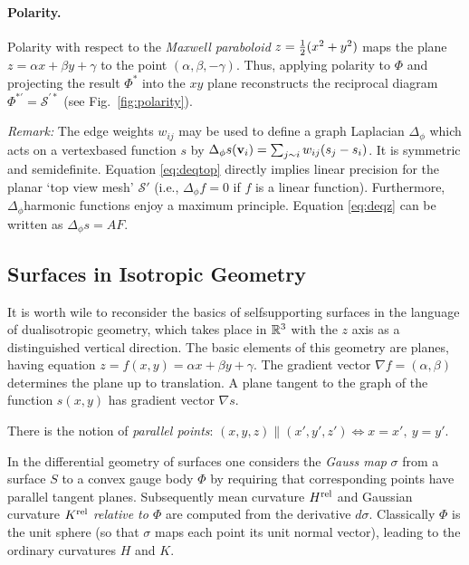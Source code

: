 \documentclass[annual]{acmsiggraph}
\def\rel{{\mathord{\text{\rm rel}}}}
\def\SS{{\mathcal S}}
\begin{document}
\paragraph{Polarity.}

Polarity with respect to the {\em Maxwell paraboloid} $z={1\over 2} 
(x^2+y^2)$ maps the plane $z=\alpha x + \beta y + \gamma$ to the point 
$(\alpha,\beta,-\gamma)$. Thus, applying polarity to $\Phi$ and projecting 
the result $\Phi^*$ into the $xy$ plane reconstructs the reciprocal 
diagram $\Phi^{*\prime}=\SS^{\prime *}$ (see Fig.~\ref{fig:polarity}).

{\it Remark:} The edge weights $w_{ij}$ may be used to define a graph 
Laplacian $\Delta_\phi$ which acts on a vertex\dash based function $s$ by 
$\Delta_{\phi} s({\mathbf v}_i)=\sum_{j\sim i} w_{ij}(s_j-s_i)$. It is symmetric 
and semidefinite. Equation \eqref{eq:deqtop} directly implies linear 
precision for the planar `top view mesh' $\SS'$ (i.e., $\Delta_\phi f=0$ 
if $f$ is a linear function). Furthermore, $\Delta_\phi$\dash harmonic 
functions enjoy a maximum principle. Equation \eqref{eq:deqz} can be 
written as $\Delta_\phi s = AF$.

\subsection{Surfaces in Isotropic Geometry} \label{sec:smooth}

It is worth wile to reconsider the basics of self\dash supporting surfaces 
in the language of dual\dash isotropic geometry, which takes place in 
${\mathbb R}^3$ with the $z$ axis as a distinguished vertical direction. The basic 
elements of this geometry are planes, having equation $z=f(x,y) = \alpha 
x+\beta y+\gamma$. The gradient vector $\nabla f = (\alpha,\beta)$ 
determines the plane up to translation. A plane tangent to the graph of 
the function $s(x,y)$ has gradient vector $\nabla s$.

There is the notion of {\em parallel points}:
	$
	(x,y,z) \parallel (x',y',z') \iff
	x=x',\ y=y'
	.$

In the differential geometry of surfaces one considers the {\em Gauss map} 
$\sigma$ from a surface $S$ to a convex gauge body $\Phi$ by requiring 
that corresponding points have parallel tangent planes.  Subsequently mean 
curvature $H^\rel$ and Gaussian curvature $K^\rel$ {\em relative to 
$\Phi$} are computed from the derivative $d\sigma$. Classically $\Phi$ is 
the unit sphere (so that $\sigma$ maps each point its unit normal vector), 
leading to the ordinary curvatures $H$ and $K$.
\end{document}
